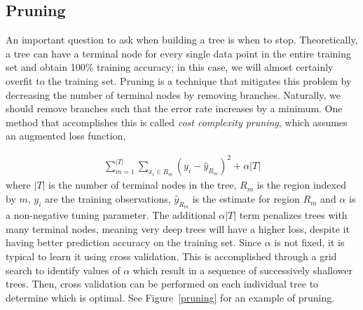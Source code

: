 \documentclass[10pt,a4paper]{article}
\begin{document}
\subsection{Pruning}
An important question to ask when building a tree is when to stop. Theoretically, a tree can have a terminal node for every single data point in the entire training set and obtain 100\% training accuracy; in this case, we will almost certainly overfit to the training set. Pruning is a technique that mitigates this problem by decreasing the number of terminal nodes by removing branches. Naturally, we should remove branches such that the error rate increases by a minimum. One method that accomplishes this is called \textit{cost complexity pruning}, which assumes an augmented loss function,

\begin{align*}
	\sum_{m=1}^{|T|} \sum_{x_i \in R_m} (y_i - \hat{y}_{R_m})^2 + \alpha |T|
\end{align*}
where $|T|$ is the number of terminal nodes in the tree, $R_m$ is the region indexed by $m$, $y_i$ are the training observations, $\hat{y}_{R_m}$ is the estimate for region $R_m$ and $\alpha$ is a non-negative tuning parameter. The additional $\alpha |T|$ term penalizes trees with many terminal nodes, meaning very deep trees will have a higher loss, despite it having better prediction accuracy on the training set. Since $\alpha$ is not fixed, it is typical to learn it using cross validation. This is accomplished through a grid search to identify values of $\alpha$ which result in a sequence of successively shallower trees. Then, cross validation can be performed on each individual tree to determine which is optimal. See Figure~\ref{pruning} for an example of pruning.
\end{document}
